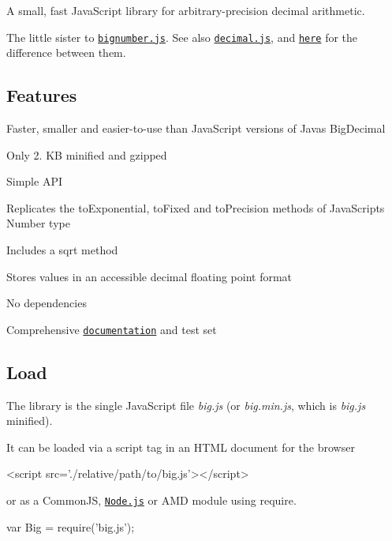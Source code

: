 A small, fast Java\+Script library for arbitrary-\/precision decimal arithmetic.

The little sister to \href{https://github.com/MikeMcl/bignumber.js/}{\tt bignumber.\+js}. See also \href{https://github.com/MikeMcl/decimal.js/}{\tt decimal.\+js}, and \href{https://github.com/MikeMcl/big.js/wiki}{\tt here} for the difference between them.

\subsection*{Features}


\begin{DoxyItemize}
\item Faster, smaller and easier-\/to-\/use than Java\+Script versions of Java\textquotesingle{}s Big\+Decimal
\item Only 2. KB minified and gzipped
\item Simple A\+PI
\item Replicates the {\ttfamily to\+Exponential}, {\ttfamily to\+Fixed} and {\ttfamily to\+Precision} methods of Java\+Script\textquotesingle{}s Number type
\item Includes a {\ttfamily sqrt} method
\item Stores values in an accessible decimal floating point format
\item No dependencies
\item Comprehensive \href{http://mikemcl.github.io/big.js/}{\tt documentation} and test set
\end{DoxyItemize}

\subsection*{Load}

The library is the single Java\+Script file {\itshape big.\+js} (or {\itshape big.\+min.\+js}, which is {\itshape big.\+js} minified).

It can be loaded via a script tag in an H\+T\+ML document for the browser \begin{DoxyVerb}<script src='./relative/path/to/big.js'></script>
\end{DoxyVerb}


or as a Common\+JS, \href{http://nodejs.org}{\tt Node.\+js} or A\+MD module using {\ttfamily require}. \begin{DoxyVerb}var Big = require('big.js');
\end{DoxyVerb}


